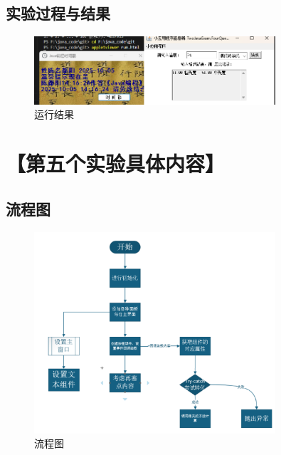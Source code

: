 \documentclass[12pt,a4paper]{article}
\begin{document}
\subsection*{实验过程与结果}

\begin{figure}[H]
\centering
\includegraphics[width=0.8\textwidth]{four.png}
\caption{运行结果}
\end{figure}

\section*{【第五个实验具体内容】}
\subsection*{流程图}

\begin{figure}[H]
\centering
\includegraphics[width=0.8\textwidth]{five1.png}
\caption{流程图}
\end{figure}
\end{document}

